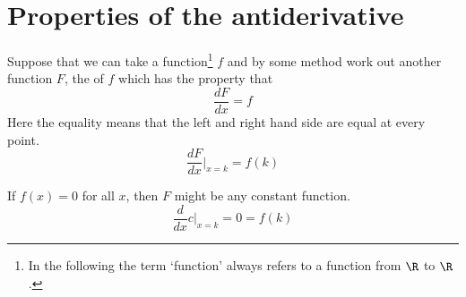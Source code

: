 \chapter{Properties of the antiderivative}

Suppose that we can take a function\footnote{In the following the term `function' always refers to a function from $\R$ to $\R$.} $f$ and by some method work out another function $F$, the  of $f$ which has the property that
\[ \frac{dF}{dx} = f \]
Here the equality means that the left and right hand side are equal at every point.
\[ \frac{dF}{dx} |_{x=k} = f(k) \]

If $f(x) = 0$ for all $x$, then $F$ might be any constant function. 
\[ \frac{d}{dx}c |_{x=k} = 0 = f(k) \]


